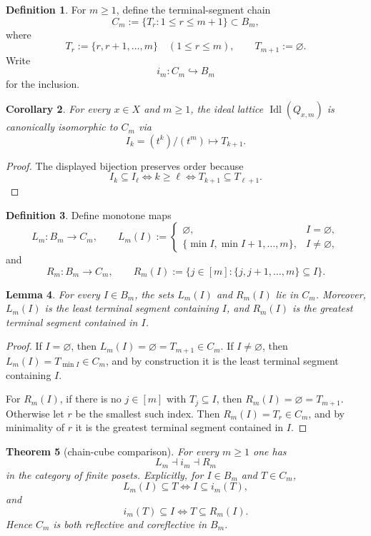 \documentclass[11pt,a4paper]{article}
\newtheorem{theorem}{Theorem}[section]
\newtheorem{lemma}[theorem]{Lemma}
\newtheorem{corollary}[theorem]{Corollary}
\theoremstyle{definition}
\newtheorem{definition}[theorem]{Definition}
\theoremstyle{remark}
\DeclareMathOperator{\Idl}{Idl}
\newcommand{\into}{\hookrightarrow}
\begin{document}
\begin{definition}
For $m\geq1$, define the terminal-segment chain
\[
C_m:=\{T_r:1\le r\le m+1\}\subset B_m,
\]
where
\[
T_r:=\{r,r+1,\dots,m\}\quad(1\le r\le m),
\qquad
T_{m+1}:=\varnothing.
\]
Write
\[
i_m:C_m\into B_m
\]
for the inclusion.
\end{definition}

\begin{corollary}\label{cor:ideal-chain-identification}
For every $x\in X$ and $m\geq1$, the ideal lattice $\Idl(Q_{x,m})$ is canonically isomorphic to $C_m$ via
\[
I_k=(t^k)/(t^m)\longmapsto T_{k+1}.
\]
\end{corollary}

\begin{proof}
The displayed bijection preserves order because
\[
I_k\subseteq I_\ell \iff k\geq \ell \iff T_{k+1}\subseteq T_{\ell+1}.
\]
\end{proof}

\begin{definition}
Define monotone maps
\[
L_m:B_m\to C_m,
\qquad
L_m(I):=
\begin{cases}
\varnothing,& I=\varnothing,\\
\{\min I,\min I+1,\dots,m\},& I\neq\varnothing,
\end{cases}
\]
and
\[
R_m:B_m\to C_m,
\qquad
R_m(I):=\{j\in[m]:\{j,j+1,\dots,m\}\subseteq I\}.
\]
\end{definition}

\begin{lemma}\label{lem:LRtails}
For every $I\in B_m$, the sets $L_m(I)$ and $R_m(I)$ lie in $C_m$. Moreover, $L_m(I)$ is the least terminal segment containing $I$, and $R_m(I)$ is the greatest terminal segment contained in $I$.
\end{lemma}

\begin{proof}
If $I=\varnothing$, then $L_m(I)=\varnothing=T_{m+1}\in C_m$. If $I\neq\varnothing$, then $L_m(I)=T_{\min I}\in C_m$, and by construction it is the least terminal segment containing $I$.

For $R_m(I)$, if there is no $j\in[m]$ with $T_j\subseteq I$, then $R_m(I)=\varnothing=T_{m+1}$. Otherwise let $r$ be the smallest such index. Then $R_m(I)=T_r\in C_m$, and by minimality of $r$ it is the greatest terminal segment contained in $I$.
\end{proof}

\begin{theorem}[chain-cube comparison]\label{thm:chain-cube}
For every $m\geq1$ one has
\[
L_m\dashv i_m\dashv R_m
\]
in the category of finite posets. Explicitly, for $I\in B_m$ and $T\in C_m$,
\[
L_m(I)\subseteq T \iff I\subseteq i_m(T),
\]
and
\[
i_m(T)\subseteq I \iff T\subseteq R_m(I).
\]
Hence $C_m$ is both reflective and coreflective in $B_m$.
\end{theorem}
\end{document}
